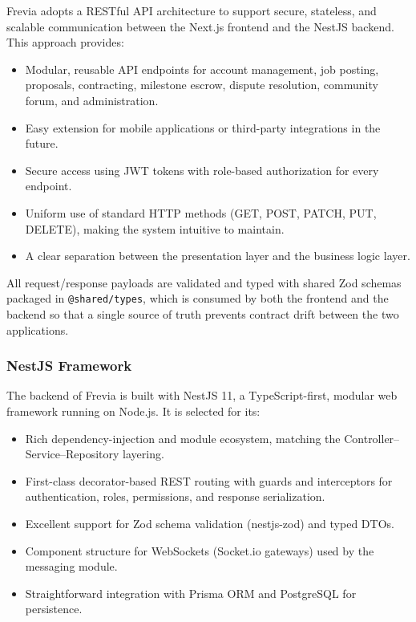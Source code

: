 Frevia adopts a RESTful API architecture to support secure, stateless, and scalable communication between the Next.js frontend and the NestJS backend. This approach provides:
\begin{itemize}[leftmargin=*]
    \item Modular, reusable API endpoints for account management, job posting, proposals, contracting, milestone escrow, dispute resolution, community forum, and administration.
    \item Easy extension for mobile applications or third-party integrations in the future.
    \item Secure access using JWT tokens with role-based authorization for every endpoint.
    \item Uniform use of standard HTTP methods (GET, POST, PATCH, PUT, DELETE), making the system intuitive to maintain.
    \item A clear separation between the presentation layer and the business logic layer.
\end{itemize}
All request/response payloads are validated and typed with shared Zod schemas packaged in \texttt{@shared/types}, which is consumed by both the frontend and the backend so that a single source of truth prevents contract drift between the two applications.


\subsubsection{NestJS Framework}

The backend of Frevia is built with NestJS 11, a TypeScript-first, modular web framework running on Node.js. It is selected for its:
\begin{itemize}[leftmargin=*]
    \item Rich dependency-injection and module ecosystem, matching the Controller--Service--Repository layering.
    \item First-class decorator-based REST routing with guards and interceptors for authentication, roles, permissions, and response serialization.
    \item Excellent support for Zod schema validation (nestjs-zod) and typed DTOs.
    \item Component structure for WebSockets (Socket.io gateways) used by the messaging module.
    \item Straightforward integration with Prisma ORM and PostgreSQL for persistence.
\end{itemize}

